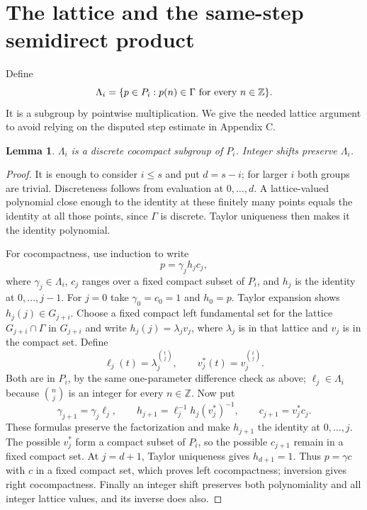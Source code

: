 \documentclass[11pt]{article}
\newtheorem{lemma}[theorem]{Lemma}
\newcommand{\Z}{\mathbb Z}
\begin{document}
\section{The lattice and the same-step semidirect product}

Define
\[
 \Lambda_i=\{p\in P_i:p(n)\in\Gamma\ \hbox{for every }n\in\Z\}.
\]
It is a subgroup by pointwise multiplication. We give the needed lattice
argument to avoid relying on the disputed step estimate in Appendix C.

\begin{lemma}\label{lem:lattice}
$\Lambda_i$ is a discrete cocompact subgroup of $P_i$. Integer shifts
preserve $\Lambda_i$.
\end{lemma}
\begin{proof}
It is enough to consider $i\leq s$ and put $d=s-i$; for larger $i$ both
groups are trivial. Discreteness follows from evaluation at
$0,\ldots,d$. A lattice-valued polynomial close enough to the identity
at these finitely many points equals the identity at all those points,
since $\Gamma$ is discrete. Taylor uniqueness then makes it the identity
polynomial.

For cocompactness, use induction to write
\[
 p=\gamma_j h_j c_j,
\]
where $\gamma_j\in\Lambda_i$, $c_j$ ranges over a fixed compact subset
of $P_i$, and $h_j$ is the identity at $0,\ldots,j-1$.
For $j=0$ take $\gamma_0=c_0=1$ and $h_0=p$.
Taylor expansion shows $h_j(j)\in G_{j+i}$.
Choose a fixed compact left fundamental set for the lattice
$G_{j+i}\cap\Gamma$ in $G_{j+i}$ and write
$h_j(j)=\lambda_j v_j$, where $\lambda_j$ is in that lattice and $v_j$
is in the compact set. Define
\[
 \ell_j(t)=\lambda_j^{\binom tj},\qquad
 v_j^*(t)=v_j^{\binom tj}.
\]
Both are in $P_i$, by the same one-parameter difference check as above;
$\ell_j\in\Lambda_i$ because $\binom nj$ is an integer for every
$n\in\Z$. Now put
\[
 \gamma_{j+1}=\gamma_j\ell_j,\qquad
 h_{j+1}=\ell_j^{-1}h_j(v_j^*)^{-1},\qquad
 c_{j+1}=v_j^*c_j.
\]
These formulas preserve the factorization and make $h_{j+1}$ the identity
at $0,\ldots,j$. The possible $v_j^*$ form a compact subset of $P_i$,
so the possible $c_{j+1}$ remain in a fixed compact set.
At $j=d+1$, Taylor uniqueness gives $h_{d+1}=1$.
Thus $p=\gamma c$ with $c$ in a fixed compact set, which proves left
cocompactness; inversion gives right cocompactness. Finally an integer
shift preserves both polynomiality and all integer lattice values, and
its inverse does also.
\end{proof}
\end{document}
